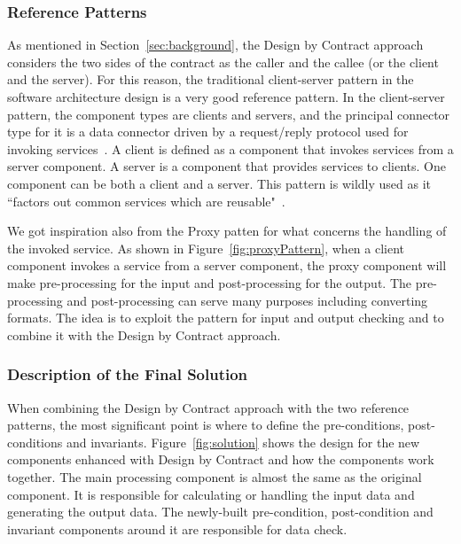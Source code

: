 \subsubsection{Reference Patterns}
As mentioned in Section~\ref{sec:background}, the Design by Contract approach considers the two sides of the contract as the caller and the callee (or the client and the server). For this reason, the traditional client-server pattern in the software architecture design is a very good reference pattern. In the client-server pattern, the component types are clients and servers, and the principal connector type for it is a data connector driven by a request/reply protocol used for invoking services~\cite{ii8}. A client is defined as a component that invokes services from a server component. A server is a component that provides services to clients. One component can be both a client and a server. This pattern is wildly used as it ``factors out common services which are reusable"~\cite{ii8}. 

We got inspiration also from the Proxy patten for what concerns the 
handling of the invoked service. %
As shown in Figure~\ref{fig:proxyPattern}, when a client component invokes a service from a server component, the proxy component will make pre-processing for the input and post-processing for the output. The pre-processing and post-processing can serve many purposes including converting formats. The idea is to exploit the pattern for input and output checking and to combine it with the Design by Contract approach.  %


\subsubsection{Description of the Final Solution}
When combining the Design by Contract approach with the two reference patterns, the most significant point is where to define the pre-conditions, post-conditions and invariants. Figure~\ref{fig:solution} shows the design for the new components enhanced with Design by Contract and how the components work together. The main processing component is almost the same as the original component. It is responsible for calculating or handling the input data and generating the output data. The newly-built pre-condition, post-condition and invariant components around it are responsible for data check. 

